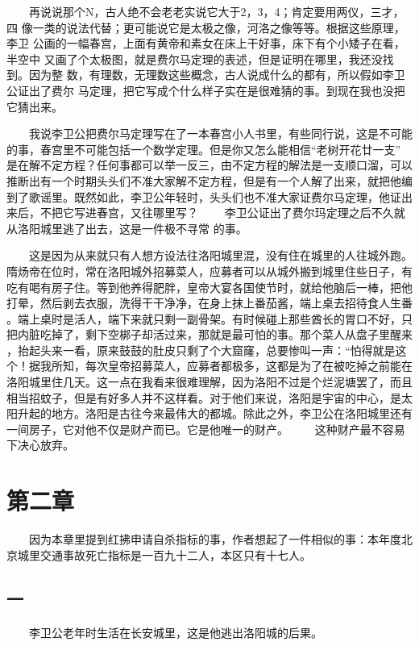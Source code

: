  　　再说说那个N，古人绝不会老老实说它大于2，3，4；肯定要用两仪，三才，四 像一类的说法代替；更可能说它是太极之像，河洛之像等等。根据这些原理，李卫 公画的一幅春宫，上面有黄帝和素女在床上干好事，床下有个小矮子在看，半空中 又画了个太极图，就是费尔马定理的表述，但是证明在哪里，我还没找到。因为整 数，有理数，无理数这些概念，古人说成什么的都有，所以假如李卫公证出了费尔 马定理，把它写成个什么样子实在是很难猜的事。到现在我也没把它猜出来。

 　　我说李卫公把费尔马定理写在了一本春宫小人书里，有些同行说，这是不可能 的事，春宫里不可能包括一个数学定理。但是你又怎么能相信“老树开花廿一支” 是在解不定方程？任何事都可以举一反三，由不定方程的解法是一支顺口溜，可以 推断出有一个时期头头们不准大家解不定方程，但是有一个人解了出来，就把他编 到了歌谣里。既然如此，李卫公年轻时，头头们也不准大家证费尔马定理，他证出 来后，不把它写进春宫，又往哪里写？ 　　李卫公证出了费尔玛定理之后不久就从洛阳城里逃了出去，这是一件极不寻常 的事。

 　　这是因为从来就只有人想方设法往洛阳城里混，没有住在城里的人往城外跑。 隋炀帝在位时，常在洛阳城外招募菜人，应募者可以从城外搬到城里住些日子，有 吃有喝有房子住。等到他养得肥胖，皇帝大宴各国使节时，就给他脑后一棒，把他 打晕，然后剥去衣服，洗得干干净净，在身上抹上番茄酱，端上桌去招待食人生番 。端上桌时是活人，端下来就只剩一副骨架。有时候碰上那些酋长的胃口不好，只 把内脏吃掉了，剩下空梆子却活过来，那就是最可怕的事。那个菜人从盘子里醒来 ，抬起头来一看，原来鼓鼓的肚皮只剩了个大窟窿，总要惨叫一声：“怕得就是这 个！据我所知，每次皇帝招募菜人，应募者都极多，这都是为了在被吃掉之前能在 洛阳城里住几天。这一点在我看来很难理解，因为洛阳不过是个烂泥塘罢了，而且 相当招蚊子，但是有好多人并不这样看。对于他们来说，洛阳是宇宙的中心，是太 阳升起的地方。洛阳是古往今来最伟大的都城。除此之外，李卫公在洛阳城里还有 一间房子，它对他不仅是财产而已。它是他唯一的财产。 　　这种财产最不容易下决心放弃。 

\section{第二章} 
 
 　　因为本章里提到红拂申请自杀指标的事，作者想起了一件相似的事：本年度北 京城里交通事故死亡指标是一百九十二人，本区只有十七人。 
 
\subsection{一} 
 
 　　李卫公老年时生活在长安城里，这是他逃出洛阳城的后果。 

